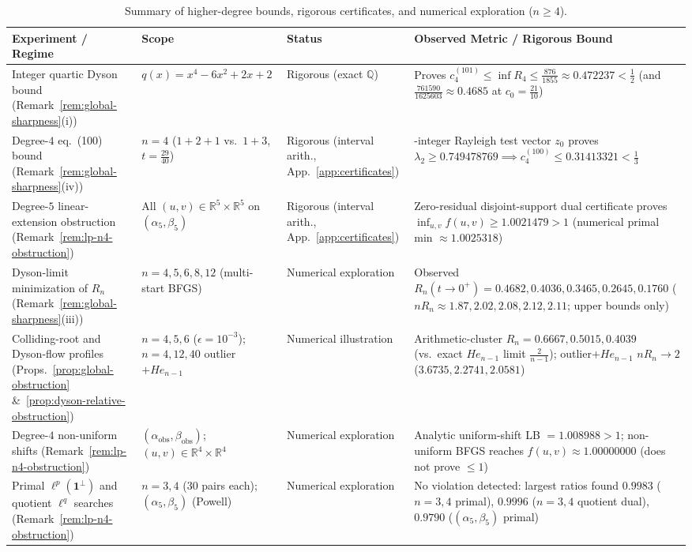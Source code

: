 \documentclass[11pt,a4paper]{article}
\theoremstyle{definition}
\newcommand{\R}{\mathbb{R}}
\newcommand{\one}{\mathbf{1}}
\begin{document}
\begin{table}[htbp]
\centering
\small
\caption{Summary of higher-degree bounds, rigorous certificates, and numerical exploration ($n \ge 4$).}
\label{tab:verif}
\begin{tabularx}{\textwidth}{@{} >{\raggedright\arraybackslash}p{3.4cm} >{\raggedright\arraybackslash}p{2.7cm} >{\raggedright\arraybackslash}p{2.4cm} >{\raggedright\arraybackslash}X @{}}
\toprule
Experiment / Regime & Scope & Status & Observed Metric / Rigorous Bound \\
\midrule
Integer quartic Dyson bound (Remark~\ref{rem:global-sharpness}(i)) & $q(x) = x^4 - 6x^2 + 2x + 2$ & Rigorous (exact $\mathbb{Q}$) & Proves $c_4^{(101)} \le \inf R_4 \le \frac{876}{1855} \approx 0.472237 < \frac{1}{2}$ (and $\frac{761590}{1625603} \approx 0.4685$ at $c_0 = \frac{21}{10}$) \\
Degree-$4$ eq.~(100) bound (Remark~\ref{rem:global-sharpness}(iv)) & $n = 4$ ($1{+}2{+}1$ vs.\ $1{+}3$, $t = \frac{29}{40}$) & Rigorous (interval arith., App.~\ref{app:certificates}) & 4-integer Rayleigh test vector $z_0$ proves $\lambda_2 \ge 0.749478769 \implies c_4^{(100)} \le 0.31413321 < \frac{1}{3}$ \\
Degree-$5$ linear-extension obstruction (Remark~\ref{rem:lp-n4-obstruction}) & All $(u,v) \in \R^5 \times \R^5$ on $(\alpha_5, \beta_5)$ & Rigorous (interval arith., App.~\ref{app:certificates}) & Zero-residual disjoint-support dual certificate proves $\inf_{u,v} f(u,v) \ge 1.0021479 > 1$ (numerical primal min $\approx 1.0025318$) \\
Dyson-limit minimization of $R_n$ (Remark~\ref{rem:global-sharpness}(iii)) & $n = 4, 5, 6, 8, 12$ (multi-start BFGS) & Numerical exploration & Observed $R_n(t\to 0^+) = 0.4682, 0.4036, 0.3465, 0.2645, 0.1760$ ($n R_n \approx 1.87, 2.02, 2.08, 2.12, 2.11$; upper bounds only) \\
Colliding-root and Dyson-flow profiles (Props.~\ref{prop:global-obstruction} \&~\ref{prop:dyson-relative-obstruction}) & $n = 4,5,6$ ($\epsilon = 10^{-3}$); $n = 4,12,40$ outlier$+He_{n-1}$ & Numerical illustration & Arithmetic-cluster $R_n = 0.6667, 0.5015, 0.4039$ (vs.\ exact $He_{n-1}$ limit $\frac{2}{n-1}$); outlier$+He_{n-1}$ $n R_n \to 2$ ($3.6735, 2.2741, 2.0581$) \\
Degree-$4$ non-uniform shifts (Remark~\ref{rem:lp-n4-obstruction}) & $(\alpha_{\mathrm{obs}}, \beta_{\mathrm{obs}})$; $(u,v) \in \R^4 \times \R^4$ & Numerical exploration & Analytic uniform-shift LB $= 1.008988 > 1$; non-uniform BFGS reaches $f(u,v) \approx 1.00000000$ (does not prove $\le 1$) \\
Primal $\ell^p(\one^\perp)$ and quotient $\ell^q$ searches (Remark~\ref{rem:lp-n4-obstruction}) & $n = 3, 4$ ($30$ pairs each); $(\alpha_5,\beta_5)$ (Powell) & Numerical exploration & No violation detected: largest ratios found $0.9983$ ($n=3,4$ primal), $0.9996$ ($n=3,4$ quotient dual), $0.9790$ ($(\alpha_5,\beta_5)$ primal) \\
\bottomrule
\end{tabularx}
\end{table}
\end{document}
